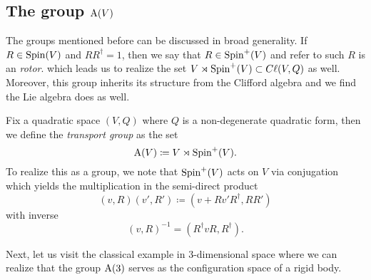 \documentclass[conf]{new-aiaa}
\begin{document}
\subsection{The group $\operatorname{A}(V)$}

The groups mentioned before can be discussed in broad generality.  If $R\in \operatorname{Spin}(V)$ and $RR^\dagger = 1$, then we say that $R\in \operatorname{Spin}^+(V)$ and refer to such $R$ is an \emph{rotor}. which leads us to realize the set $V\rtimes \operatorname{Spin}^+(V) \subset C\ell(V,Q)$ as well. Moreover, this group inherits its structure from the Clifford algebra and we find the Lie algebra does as well. 

\begin{definition}
Fix a quadratic space $(V,Q)$ where $Q$ is a non-degenerate quadratic form, then we define the \emph{transport group} as the set
\begin{equation}
\operatorname{A}(V)\coloneqq V\rtimes \operatorname{Spin}^+(V).
\end{equation}
To realize this as a group, we note that $\operatorname{Spin}^+(V)$ acts on $V$ via conjugation which yields the multiplication in the semi-direct product
\begin{equation}
\label{eq:product_in_A}
(v,R)(v',R')\coloneqq(v+Rv'R^\dagger, RR')
\end{equation}
with inverse
\begin{equation}
(v,R)^{-1} = (R^\dagger v R, R^\dagger).
\end{equation}
\end{definition}

Next, let us visit the classical example in 3-dimensional space where we can realize that the group $\operatorname{A}(3)$ serves as the configuration space of a rigid body.
\end{document}
